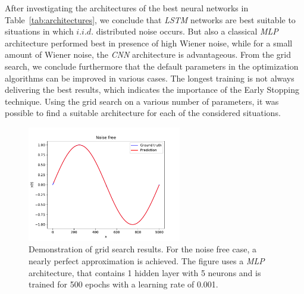 After 
investigating the architectures of the best neural networks in 
Table~\ref{tab:architectures}, we conclude that \emph{LSTM} networks are best 
suitable to situations in which $i.i.d.$ distributed 
noise occurs. But also a 
classical \emph{MLP} architecture performed best in presence of high Wiener
noise, while for a small amount
of Wiener noise, the \emph{CNN} architecture is advantageous. From the 
grid search, we conclude furthermore that the default parameters in the 
optimization algorithms can be improved in various cases. The longest training
is not always delivering the best results, which indicates the importance of 
the Early Stopping technique. Using the grid search on a various number of
parameters, it was possible to find a suitable architecture for each of the
considered situations.

\begin{figure}
    \centering
    \includegraphics[width=0.6\textwidth]{figures/Noise_free.pdf}
    \caption{Demonstration of grid search results. For the noise free case,
    a nearly perfect approximation is achieved. The figure uses a \emph{MLP}
    architecture, that contains 1 hidden layer with 5 neurons and is trained 
    for 500 epochs with a learning rate of 0.001.}
    \label{fig:sinenoisefree}
\end{figure}

